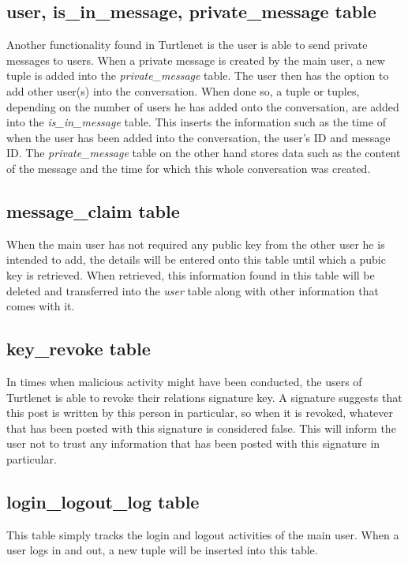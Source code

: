 \subsection{user, is\_in\_message, private\_message table}
Another functionality found in Turtlenet is the user is able to send private 
messages to users. When a private message is created by the main user, a new 
tuple is added into the {\it private\_message} table. The user then has the 
option to add other user(s) into the conversation. When done so, a tuple or 
tuples, depending on the number of users he has added onto the conversation, are 
added into the {\it is\_in\_message} table. This inserts the information such as 
the time of when the user has been added into the conversation, the user's ID 
and message ID. The {\it private\_message} table on the other hand stores data 
such as the content of the message and the time for which this whole conversation 
was created. 

\subsection{message\_claim table}
When the main user has not required any public key from the other user he is 
intended to add, the details will be entered onto this table until which a pubic 
key is retrieved. When retrieved, this information found in this table will be 
deleted and transferred into the {\it user} table along with other information 
that comes with it.

\subsection{key\_revoke table}
In times when malicious activity might have been conducted, the users of 
Turtlenet is able to revoke their relations signature key. A signature suggests 
that this post is written by this person in particular, so when it is revoked, 
whatever that has been posted with this signature is considered false. This will 
inform the user not to trust any information that has been posted with this 
signature in particular. 

\subsection{login\_logout\_log table}
This table simply tracks the login and logout activities of the main user. When a 
user logs in and out, a new tuple will be inserted into this table.


